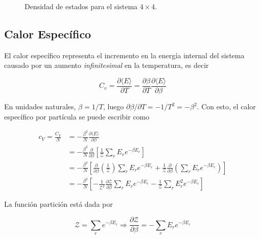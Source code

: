 \documentclass[a4paper,12pt]{article}
\begin{document}
     \begin{figure}[H]
     \centering
     \caption{Densidad de estados para el sistema $4 \times 4$.}
     \label{fig:histograma-texto}
   \end{figure}

   \subsection{Calor Específico}

\noindent El calor específico representa el incremento en la energía internal del sistema causado por un aumento \textit{infinitesimal} en la temperatura, es decir

\begin{equation}
C_{v} = \frac{\partial \langle E \rangle}{\partial T} =  \frac{\partial \beta}{\partial T} \frac{\partial \langle E \rangle}{\partial \beta}
\end{equation}

\noindent En unidades naturales, $\beta = 1/T$, luego $\partial \beta / \partial T = -1/T^2 = -\beta^2$. Con esto, el calor específico por partícula se puede escribir como

\begin{align}
  c_{V}= \frac{C_{V}}{N} &= -\frac{\beta ^2}{N}\frac{\partial \langle E \rangle}{\partial \beta}\nonumber \\
                         &= -\frac{\beta ^2}{N} \frac{\partial}{\partial \beta}\left[ \frac{1}{\mathcal{Z}} \sum_{r} E_{r} e^{-\beta E_{r}} \right]\nonumber \\
                         &= -\frac{\beta ^2}{N} \left[ \frac{\partial}{\partial \beta} \left( \frac{1}{\mathcal{Z}}\right)\sum_{r} E_{r} e^{-\beta E_{r}} +  \frac{1}{\mathcal{Z}} \frac{\partial}{\partial \beta} \left( \sum_{r} E_{r} e^{-\beta E_{r}}\right) \right]\nonumber \\
                         &=  -\frac{\beta ^2}{N} \left[ -\frac{1}{\mathcal{Z}^2} \frac{\partial \mathcal{Z}}{\partial \beta} \sum_{r} E_{r} e^{-\beta E_{r}} -  \frac{1}{\mathcal{Z}}  \sum_{r} E_{r}^2 e^{-\beta E_{r}}  \right]
                           \label{eq:cv}
\end{align}

\noindent La función partición está dada por

\begin{equation}
\mathcal{Z} = \sum_{r} e^{-\beta E_{r}} \Longrightarrow  \frac{\partial \mathcal{Z}}{\partial \beta} = -\sum_{r} E_{r}e^{-\beta E_{r}}
  \end{equation}
\end{document}
